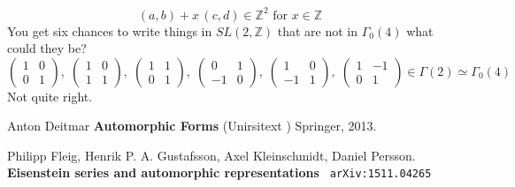 \documentclass[12pt]{article}
\begin{document}
$$ (a,b) + x \, (c,d) \in \mathbb{Z}^2 \text{ for } x \in \mathbb{Z}$$
You get six chances to write things in $SL(2, \mathbb{Z})$ that are not in $\Gamma_0(4)$ what could they be?
$$
\left( \begin{array}{cc} 1 &  0 \\  0 & 1\end{array} \right),\; 
\left( \begin{array}{cc} 1 &  0 \\  1 & 1\end{array} \right),\; 
\left( \begin{array}{cc} 1 &  1 \\  0 & 1\end{array} \right),\; 
\left( \begin{array}{rc} 0 &  1 \\ -1 & 0\end{array} \right),\; 
\left( \begin{array}{rc} 1 &  0 \\ -1 & 1\end{array} \right),\; 
\left( \begin{array}{cr} 1 & -1 \\  0 & 1\end{array} \right) 
 \in \Gamma(2) \simeq \Gamma_0(4)$$
Not quite right.
\vfill

\begin{thebibliography}{}

\item Anton Deitmar \textbf{Automorphic Forms} (Unirsitext ) Springer, 2013.

\item Philipp Fleig, Henrik P. A. Gustafsson, Axel Kleinschmidt, Daniel Persson. \textbf{Eisenstein series and automorphic representations} \texttt{ arXiv:1511.04265}

\end{thebibliography}
\end{document}

